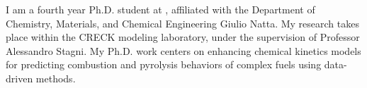 I am a fourth year Ph.D. student at \polimi, affiliated with the Department of Chemistry,
Materials, and Chemical Engineering Giulio Natta. My research takes place within the
CRECK modeling laboratory, under the supervision of Professor Alessandro Stagni. My Ph.D.
work centers on enhancing chemical kinetics models for predicting combustion and
pyrolysis behaviors of complex fuels using data-driven methods.

